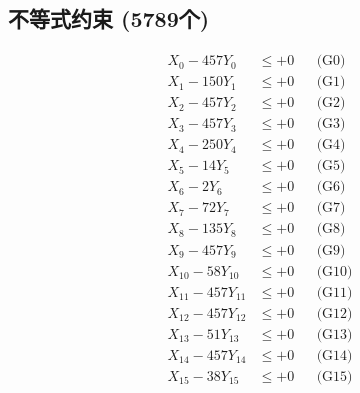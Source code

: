 \documentclass[a4paper,10pt]{article}
\begin{document}
\subsection{不等式约束 (5789个)}

\allowdisplaybreaks
{\small
\begin{align}
\allowbreak
\allowbreak
\allowbreak
\allowbreak
\allowbreak
\allowbreak
\allowbreak
\allowbreak
\allowbreak
\allowbreak
\allowbreak
\allowbreak
\allowbreak
\allowbreak
\allowbreak
\allowbreak
\allowbreak
\allowbreak
\allowbreak
\allowbreak
\allowbreak
\allowbreak
\allowbreak
\allowbreak
\allowbreak
\allowbreak
\allowbreak
\allowbreak
\allowbreak
\allowbreak
\allowbreak
\allowbreak
\allowbreak
\allowbreak
\allowbreak
\allowbreak
\allowbreak
\allowbreak
\allowbreak
\allowbreak
\allowbreak
\allowbreak
\allowbreak
\allowbreak
\allowbreak
\allowbreak
\allowbreak
\allowbreak
\allowbreak
\allowbreak
\allowbreak
\allowbreak
\allowbreak
\allowbreak
\allowbreak
\allowbreak
\allowbreak
\allowbreak
\allowbreak
\allowbreak
\allowbreak
\allowbreak
\allowbreak
\allowbreak
\allowbreak
\allowbreak
\allowbreak
\allowbreak
\allowbreak
\allowbreak
\allowbreak
\allowbreak
\allowbreak
\allowbreak
\allowbreak
\allowbreak
\allowbreak
\allowbreak
X_{0} - 457Y_{0} &\leq +0 && \text{(G0)} \\
\allowbreak
X_{1} - 150Y_{1} &\leq +0 && \text{(G1)} \\
X_{2} - 457Y_{2} &\leq +0 && \text{(G2)} \\
X_{3} - 457Y_{3} &\leq +0 && \text{(G3)} \\
X_{4} - 250Y_{4} &\leq +0 && \text{(G4)} \\
X_{5} - 14Y_{5} &\leq +0 && \text{(G5)} \\
X_{6} - 2Y_{6} &\leq +0 && \text{(G6)} \\
X_{7} - 72Y_{7} &\leq +0 && \text{(G7)} \\
X_{8} - 135Y_{8} &\leq +0 && \text{(G8)} \\
X_{9} - 457Y_{9} &\leq +0 && \text{(G9)} \\
X_{10} - 58Y_{10} &\leq +0 && \text{(G10)} \\
\allowbreak
X_{11} - 457Y_{11} &\leq +0 && \text{(G11)} \\
X_{12} - 457Y_{12} &\leq +0 && \text{(G12)} \\
X_{13} - 51Y_{13} &\leq +0 && \text{(G13)} \\
X_{14} - 457Y_{14} &\leq +0 && \text{(G14)} \\
X_{15} - 38Y_{15} &\leq +0 && \text{(G15)} \\

\end{align}}
\end{document}
